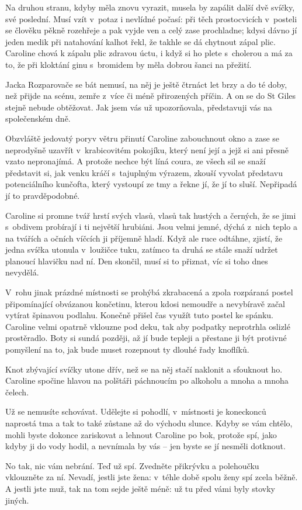 Na druhou stranu, kdyby měla znovu vyrazit, musela by zapálit další dvě svíčky, své poslední. Musí vzít v potaz i nevlídné počasí: při těch prostocvicích v posteli se člověku pěkně rozehřeje a pak vyjde ven a celý zase prochladne; kdysi dávno jí jeden medik při natahování kalhot řekl, že takhle se dá chytnout zápal plic. Caroline chová k zápalu plic zdravou úctu, i když si ho plete s cholerou a má za to, že při kloktání ginu s bromidem by měla dobrou šanci na přežití.

Jacka Rozparovače se bát nemusí, na něj je ještě čtrnáct let brzy a do té doby, než přijde na scénu, zemře z více či méně přirozených příčin. A on se do St Giles stejně nebude obtěžovat. Jak jsem vás už upozorňovala, představuji vás na společenském dně. 

Obzvláště jedovatý poryv větru přinutí Caroline zabouchnout okno a zase se neprodyšně uzavřít v krabicovitém pokojíku, který není její a jejž si ani přesně vzato nepronajímá. A protože nechce být líná coura, ze všech sil se snaží představit si, jak venku kráčí s tajuplným výrazem, zkouší vyvolat představu potenciálního kunčofta, který vystoupí ze tmy a řekne jí, že jí to sluší. Nepřipadá jí to pravdě\-podobné. 

Caroline si promne tvář hrstí svých vlasů, vlasů tak hustých a černých, že se jimi s obdivem probírají i ti největší hrubiáni. Jsou velmi jemné, dýchá z nich teplo a na tvářích a očních víčcích ji příjemně hladí. Když ale ruce odtáhne, zjistí, že jedna svíčka utonula v loužičce tuku, zatímco ta druhá se stále snaží udržet planoucí hlavičku nad ní. Den skončil, musí si to přiznat, víc si toho dnes nevydělá.

V rohu jinak prázdné místnosti se prohýbá zkrabacená a zpola rozpáraná postel připomínající obvázanou končetinu, kterou kdosi nemoudře a nevybíravě začal vytírat špinavou podlahu. Konečně přišel čas využít tuto postel ke spánku. Caroline velmi opatrně vklouzne pod deku, tak aby podpatky neprotrhla oslizlé prostěradlo. Boty si sundá později, až jí bude tepleji a přestane ji být protivné pomyšlení na to, jak bude muset rozepnout ty dlouhé řady knoflíků. 

Knot zbývající svíčky utone dřív, než se na něj stačí naklonit a sfouknout ho. Caroline spočine hlavou na polštáři páchnoucím po alkoholu a mnoha a mnoha čelech. 

Už se nemusíte schovávat. Udělejte si pohodlí, v místnosti je koneckonců naprostá tma a tak to také zůstane až do východu slunce. Kdyby se vám chtělo, mohli byste dokonce zariskovat a lehnout Caroline po bok, protože spí, jako kdyby ji do vody hodil, a nevnímala by vás -- jen byste se jí nesměli dotknout.

No tak, nic vám nebrání. Teď už spí. Zvedněte přikrývku a polehoučku vklouzněte za ní. Nevadí, jestli jste žena: v téhle době spolu ženy spí zcela běžně. A jestli jste muž, tak na tom sejde ještě méně: už tu před vámi byly stovky jiných.

